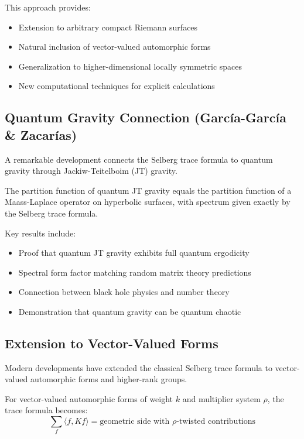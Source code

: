 This approach provides:
\begin{itemize}
\item Extension to arbitrary compact Riemann surfaces
\item Natural inclusion of vector-valued automorphic forms
\item Generalization to higher-dimensional locally symmetric spaces
\item New computational techniques for explicit calculations
\end{itemize}

\subsection{Quantum Gravity Connection (García-García \& Zacarías)}

A remarkable development connects the Selberg trace formula to quantum gravity through Jackiw-Teitelboim (JT) gravity.

\begin{theorem}
\label{thm:jt_selberg}
The partition function of quantum JT gravity equals the partition function of a Maass-Laplace operator on hyperbolic surfaces, with spectrum given exactly by the Selberg trace formula.
\end{theorem}

Key results include:
\begin{itemize}
\item Proof that quantum JT gravity exhibits full quantum ergodicity
\item Spectral form factor matching random matrix theory predictions
\item Connection between black hole physics and number theory
\item Demonstration that quantum gravity can be quantum chaotic
\end{itemize}

\subsection{Extension to Vector-Valued Forms}

Modern developments have extended the classical Selberg trace formula to vector-valued automorphic forms and higher-rank groups.

\begin{definition}
\label{def:vector_valued_trace}
For vector-valued automorphic forms of weight $k$ and multiplier system $\rho$, the trace formula becomes:
$$\sum_{f} \langle f, Kf \rangle = \text{geometric side with } \rho\text{-twisted contributions}$$
\end{definition}

